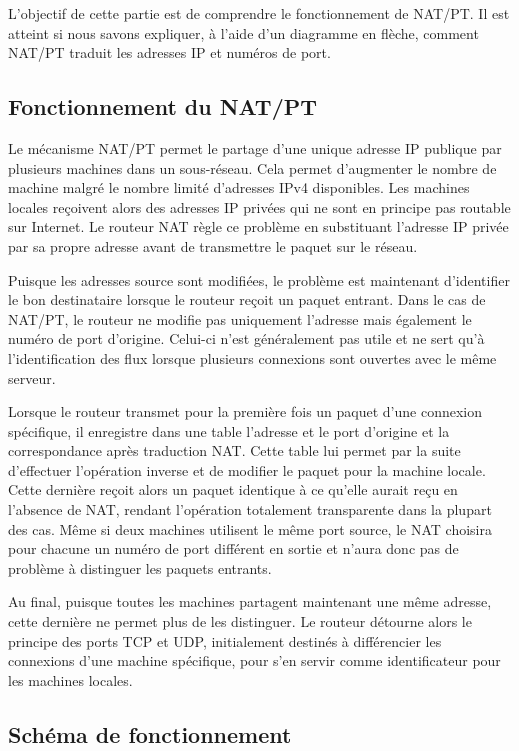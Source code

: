 \documentclass[11pt,a4paper]{article}
\begin{document}
L'objectif de cette partie est de comprendre le fonctionnement de NAT/PT. Il est atteint si nous savons expliquer, à l'aide d'un diagramme en flèche, comment NAT/PT traduit les adresses IP et numéros de port.

\subsection{Fonctionnement du NAT/PT}

Le mécanisme NAT/PT permet le partage d'une unique adresse IP publique par plusieurs machines dans un sous-réseau. Cela permet d'augmenter le nombre de machine malgré le nombre limité d'adresses IPv4 disponibles.
Les machines locales reçoivent alors des adresses IP privées qui ne sont en principe pas routable sur Internet. Le routeur NAT règle ce problème en substituant l'adresse IP privée par sa propre adresse avant de transmettre le paquet sur le réseau. 

Puisque les adresses source sont modifiées, le problème est maintenant d'identifier le bon destinataire lorsque le routeur reçoit un paquet entrant.
Dans le cas de NAT/PT, le routeur ne modifie pas uniquement l'adresse mais également le numéro de port d'origine. Celui-ci n'est généralement pas utile et ne sert qu'à l'identification des flux lorsque plusieurs connexions sont ouvertes avec le même serveur.

Lorsque le routeur transmet pour la première fois un paquet d'une connexion spécifique, il enregistre dans une table l'adresse et le port d'origine et la correspondance après traduction NAT. Cette table lui permet par la suite d'effectuer l'opération inverse et de modifier le paquet pour la machine locale. Cette dernière reçoit alors un paquet identique à ce qu'elle aurait reçu en l'absence de NAT, rendant l'opération totalement transparente dans la plupart des cas. Même si deux machines utilisent le même port source, le NAT choisira pour chacune un numéro de port différent en sortie et n'aura donc pas de problème à distinguer les paquets entrants.

Au final, puisque toutes les machines partagent maintenant une même adresse, cette dernière ne permet plus de les distinguer. Le routeur détourne alors le principe des ports TCP et UDP, initialement destinés à différencier les connexions d'une machine spécifique, pour s'en servir comme identificateur pour les machines locales.

\subsection{Schéma de fonctionnement}
\end{document}
